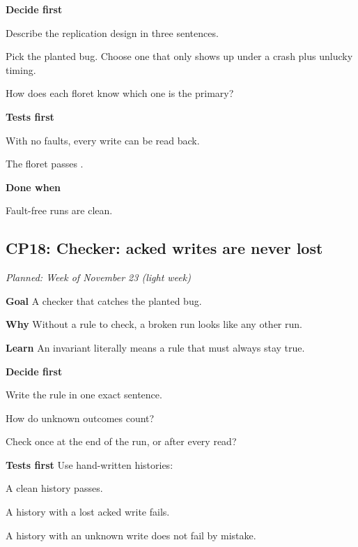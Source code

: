 \documentclass[11pt,letterpaper]{article}
\newcommand{\code}[1]{\texttt{\detokenize{#1}}}
\newcommand{\lbl}[1]{\textbf{#1}\enspace}
\newcommand{\when}[1]{\par\textit{Planned: #1}\par}
\begin{document}
\lbl{Decide first}
\begin{asks}
  \item Describe the replication design in three sentences.
  \item Pick the planted bug. Choose one that only shows up under a crash plus unlucky timing.
  \item How does each floret know which one is the primary?
\end{asks}

\lbl{Tests first}
\begin{checks}
  \item With no faults, every write can be read back.
  \item The floret passes \code{check-determinism}.
\end{checks}

\lbl{Done when}
\begin{checks}
  \item Fault-free runs are clean.
\end{checks}

\subsection{CP18: Checker: acked writes are never lost}
\when{Week of November 23 (light week)}

\lbl{Goal} A checker that catches the planted bug.

\lbl{Why} Without a rule to check, a broken run looks like any other run.

\lbl{Learn} An invariant literally means a rule that must always stay true.

\lbl{Decide first}
\begin{asks}
  \item Write the rule in one exact sentence.
  \item How do unknown outcomes count?
  \item Check once at the end of the run, or after every read?
\end{asks}

\lbl{Tests first} Use hand-written histories:
\begin{checks}
  \item A clean history passes.
  \item A history with a lost acked write fails.
  \item A history with an unknown write does not fail by mistake.
\end{checks}
\end{document}
